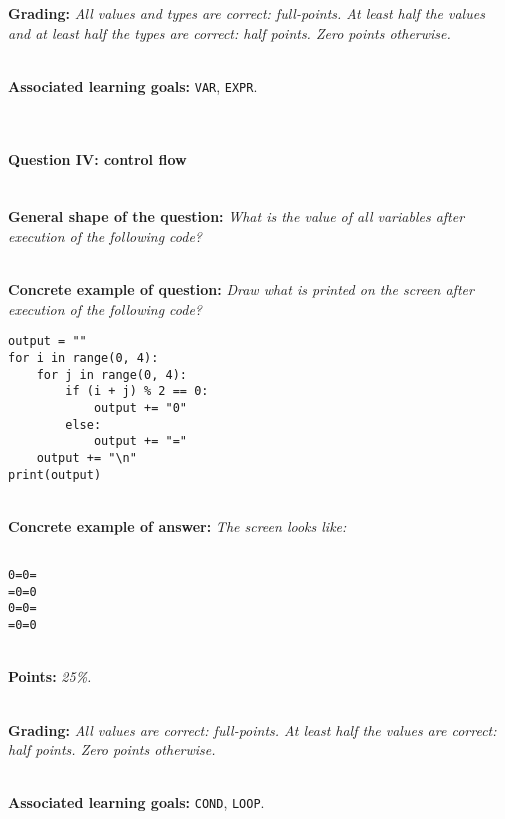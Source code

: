 \textbf{Grading:} \textit{All values and types are correct: full-points. At least half the values and at least half the types are correct: half points. Zero points otherwise.}

\ \\ 

\textbf{Associated learning goals:} \texttt{VAR}, \texttt{EXPR}.

\ \\ 

\paragraph{Question IV: control flow}

\ \\ 

\textbf{General shape of the question:} \textit{What is the value of all variables after execution of the following code?}

\ \\ 

\textbf{Concrete example of question:} \textit{Draw what is printed on the screen after execution of the following code?}

\begin{lstlisting}
output = ""
for i in range(0, 4):
    for j in range(0, 4):
        if (i + j) % 2 == 0:
            output += "0"
        else:
            output += "="
    output += "\n"
print(output)
\end{lstlisting}

\ \\ 

\textbf{Concrete example of answer:} \textit{The screen looks like:}
\begin{lstlisting}

0=0=
=0=0
0=0=
=0=0

\end{lstlisting}

\ \\ 

\textbf{Points:} \textit{25\%.}

\ \\ 

\textbf{Grading:} \textit{All values are correct: full-points. At least half the values are correct: half points. Zero points otherwise.}

\ \\ 

\textbf{Associated learning goals:} \texttt{COND}, \texttt{LOOP}.

\ \\ 
